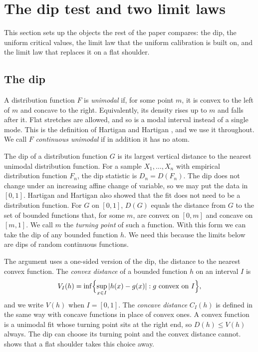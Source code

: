 \section{The dip test and two limit laws}\label{sec:setting}

This section sets up the objects the rest of the paper compares: the dip, the uniform critical values, the limit law that the uniform calibration is built on, and the limit law that replaces it on a flat shoulder.

\subsection{The dip}
A distribution function $F$ is \emph{unimodal} if, for some point $m$, it is convex to the left of $m$ and concave to the right. Equivalently, its density rises up to $m$ and falls after it. Flat stretches are allowed, and so is a modal interval instead of a single mode. This is the definition of Hartigan and Hartigan \cite{HH85}, and we use it throughout. We call $F$ \emph{continuous unimodal} if in addition it has no atom.

The dip of a distribution function $G$ is its largest vertical distance to the nearest unimodal distribution function. For a sample $X_1,\dots,X_n$ with empirical distribution function $F_n$, the dip statistic is $D_n=D(F_n)$. The dip does not change under an increasing affine change of variable, so we may put the data in $[0,1]$. Hartigan and Hartigan \cite[Theorem~1]{HH85} also showed that the fit does not need to be a distribution function. For $G$ on $[0,1]$, $D(G)$ equals the distance from $G$ to the set of bounded functions that, for some $m$, are convex on $[0,m]$ and concave on $[m,1]$. We call $m$ the \emph{turning point} of such a function. With this form we can take the dip of any bounded function $h$. We need this because the limits below are dips of random continuous functions.

The argument uses a one-sided version of the dip, the distance to the nearest convex function. The \emph{convex distance} of a bounded function $h$ on an interval $I$ is
\[
V_I(h)=\inf\Bigl\{\sup_{x\in I}|h(x)-g(x)| : g \text{ convex on } I\Bigr\},
\]
and we write $V(h)$ when $I=[0,1]$. The \emph{concave distance} $C_I(h)$ is defined in the same way with concave functions in place of convex ones. A convex function is a unimodal fit whose turning point sits at the right end, so $D(h)\le V(h)$ always. The dip can choose its turning point and the convex distance cannot.  shows that a flat shoulder takes this choice away.


